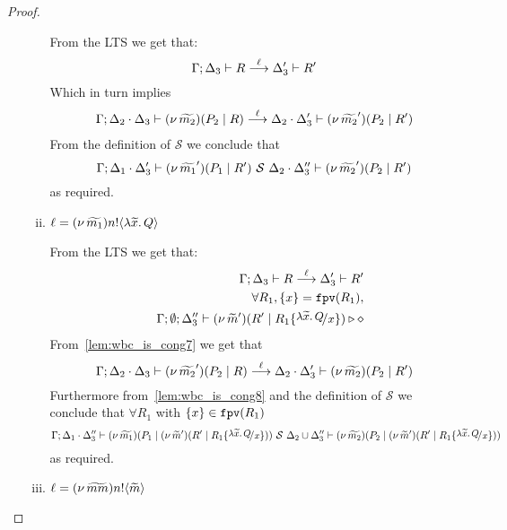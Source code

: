 \begin{proof}
\begin{enumerate}
\begin{enumerate}[i.]
							\noi From the LTS we get that:
							\[
								\Gamma; \Delta_3 \vdash R \stackrel{\ell}{\longrightarrow} \Delta_3' \vdash R'
							\]
							\noi Which in turn implies
							\begin{eqnarray*}
								\Gamma; \Delta_2 \cdot \Delta_3 \vdash (\nu\, \widetilde{m_2})(P_2 \;|\; R) \stackrel{\ell}{\longrightarrow} \Delta_2 \cdot \Delta_3' \vdash (\nu\, \widetilde{m_2}')(P_2 \;|\; R')
							\end{eqnarray*}
							\noi From the definition of $\mathcal{S}$ we conclude that
							\[
								\Gamma; \Delta_1 \cdot \Delta_3' \vdash (\nu\, \widetilde{m_1}')(P_1 \;|\; R') \ \mathcal{S}\  \Delta_2 \cdot \Delta_3'' \vdash (\nu\, \widetilde{m_2}')(P_2 \;|\; R')
							\]
							\noi as required.

				\item	$\ell = (\nu\, \widetilde{m_1}) n ! \langle \lambda \widetilde{x}.\,Q \rangle$

						\noi From the LTS we get that:
						\begin{eqnarray}
							& &	\horel{\Gamma}{\Delta_3}{R}{\by{\ell}}{\Delta_3'}{R'}
								\label{lem:wbc_is_cong7}\\
							& & 	\forall R_1, \set{x} = \fpv{R_1},
								\nonumber\\
							& &	\Gamma; \emptyset; \Delta_3'' \proves \newsp{\widetilde{m}'}{R' \Par R_1 \subst{\abs{\widetilde{x}}{Q}}{x}} \hastype \Proc
								\label{lem:wbc_is_cong8}
						\end{eqnarray}
						\noi From~\eqref{lem:wbc_is_cong7} we get that
						\[
							\Gamma; \Delta_2 \cdot \Delta_3 \vdash (\nu\, \widetilde{m_2}')(P_2 \;|\; R) \stackrel{\ell}{\longrightarrow} \Delta_2 \cdot \Delta_3' \vdash (\nu\, \widetilde{m_2})(P_2 \;|\; R')
						\]
						\noi Furthermore from~\eqref{lem:wbc_is_cong8} and the definition of $\mathcal{S}$ we conclude that
						$\forall R_1$ with $\{x\} \in \mathtt{fpv}(R_1)$
						\[
							\horel{\Gamma}{\Delta_1 \cat \Delta_3''}{\newsp{\widetilde{m_1}}{P_1 \Par \newsp{\widetilde{m}'}{R' \Par R_1 \subst{\abs{\widetilde{x}}{Q}}{x}}}}
							{\ \mathcal{S}\ }
							{\Delta_2 \cup \Delta_3''}{\newsp{\widetilde{m_2}}{P_2 \Par \newsp{\widetilde{m}'}{R' \Par R_1 \subst{\abs{\widetilde{x}}{Q}}{x}}}}
						\]
						\noi as required.

				\item	$\ell = (\nu\, \widetilde{mm}) n ! \langle \widetilde{m} \rangle$


\end{enumerate}
\end{enumerate}
\end{proof}
